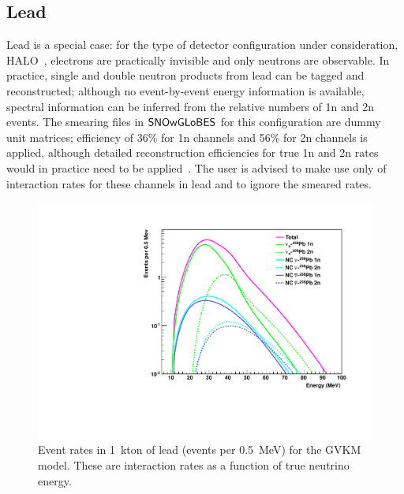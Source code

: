 \documentclass[12pt]{article}
\newcommand{\snowglobes}{\sf{SNOwGLoBES}}
\begin{document}
\subsection{Lead}

Lead is a special case: for the type of detector configuration under
consideration, HALO~\cite{Duba:2008zz}, electrons are practically invisible
and only neutrons are observable.  In practice, single and double
neutron products from lead can be tagged and reconstructed; although
no event-by-event energy information is available, spectral information can be
inferred from the relative numbers of 1n and 2n events.  The smearing
files in $\snowglobes$ for this configuration are dummy unit matrices;
efficiency of 36\% for 1n channels and 56\% for 2n channels is
applied, although detailed reconstruction efficiencies for true 1n and
2n rates would in practice need to be applied~\cite{halo}.  The user is
advised to make use only of interaction rates for these channels in
lead and to ignore the smeared rates.

\begin{figure}[htb]
  \centering\includegraphics[width=.75\textwidth]{interaction_rates_gvkm_halo2.pdf}

  \caption{Event rates in 1~kton of lead (events per 0.5~MeV) for the GVKM model. These
    are interaction rates as a function of true neutrino energy.}
  \label{fig:leadrates}
\end{figure}
\end{document}
